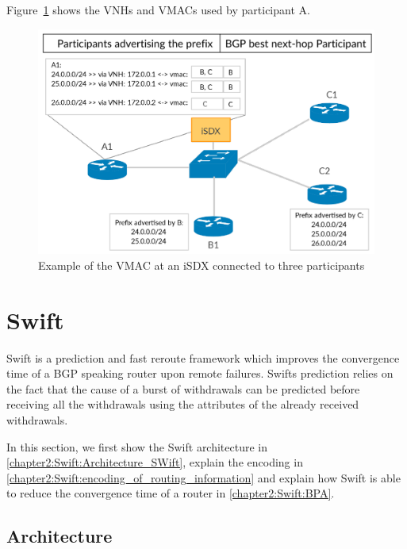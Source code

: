 Figure~\ref{fig:isdx_vmac} shows the VNHs and VMACs used by participant A.

\begin{figure}[h]
\center
\includegraphics[scale = 0.36]{Figures/bckgrnd_sdx_vmac_cropped.pdf}
\caption{Example of the VMAC at an iSDX connected to three participants}
\label{fig:isdx_vmac}
\end{figure}

\section{\label{chapter2:Swift}Swift}

Swift is a prediction and fast reroute framework which improves the convergence time of a BGP speaking router upon remote failures. Swifts prediction relies on the fact that the cause of a burst of withdrawals can be predicted before receiving all the withdrawals using the attributes of the already received withdrawals.

In this section, we first show the Swift architecture in \ref{chapter2:Swift:Architecture_SWift}, explain the encoding in \ref{chapter2:Swift:encoding_of_routing_information} and explain how Swift is able to reduce the convergence time of a router in \ref{chapter2:Swift:BPA}.

\subsection{\label{chapter2:Swift:Architecture_SWift}Architecture}

